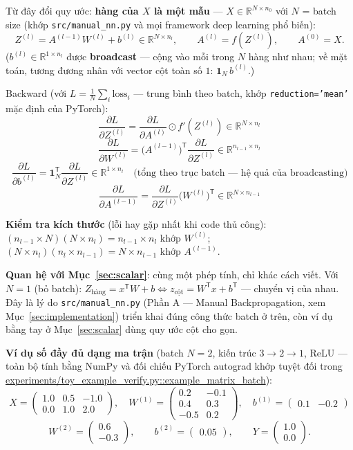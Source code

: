 \documentclass[12pt,a4paper]{article}
\newcommand{\T}{^{\mathsf{T}}}
\begin{document}
Từ đây đổi quy ước: \textbf{hàng của $X$ là một mẫu} ---
$X\in\mathbb R^{N\times n_0}$ với $N$ = batch size (khớp
\texttt{src/manual\_nn.py} và mọi framework deep learning phổ biến):
$$Z^{(l)} = A^{(l-1)}W^{(l)} + b^{(l)} \in \mathbb R^{N\times n_l},\qquad
A^{(l)} = f(Z^{(l)}),\qquad A^{(0)}=X.$$
($b^{(l)}\in\mathbb R^{1\times n_l}$ được \textbf{broadcast} --- cộng vào
mỗi trong $N$ hàng như nhau; về mặt toán, tương đương nhân với vector cột
toàn số $1$: $\mathbf 1_N\, b^{(l)}$.)

Backward (với $L=\tfrac1N\sum_i \mathrm{loss}_i$ --- trung bình theo batch,
khớp \texttt{reduction='mean'} mặc định của PyTorch):
$$\frac{\partial L}{\partial Z^{(l)}} = \frac{\partial L}{\partial A^{(l)}}\odot f'(Z^{(l)}) \in \mathbb R^{N\times n_l}$$
$$\frac{\partial L}{\partial W^{(l)}} = \big(A^{(l-1)}\big)\T\frac{\partial L}{\partial Z^{(l)}} \in \mathbb R^{n_{l-1}\times n_l}$$
$$\frac{\partial L}{\partial b^{(l)}} = \mathbf 1_N\T\frac{\partial L}{\partial Z^{(l)}} \in \mathbb R^{1\times n_l}\quad\text{(tổng theo trục batch --- hệ quả của broadcasting)}$$
$$\frac{\partial L}{\partial A^{(l-1)}} = \frac{\partial L}{\partial Z^{(l)}}\big(W^{(l)}\big)\T \in \mathbb R^{N\times n_{l-1}}$$

\textbf{Kiểm tra kích thước} (lỗi hay gặp nhất khi code thủ công):
$(n_{l-1}\times N)(N\times n_l)=n_{l-1}\times n_l$ khớp $W^{(l)}$;
$(N\times n_l)(n_l\times n_{l-1})=N\times n_{l-1}$ khớp $A^{(l-1)}$.

\textbf{Quan hệ với Mục~\ref{sec:scalar}}: cùng một phép tính, chỉ khác
cách viết. Với $N=1$ (bỏ batch): $Z_{\text{hàng}} = x\T W+b
\Leftrightarrow z_{\text{cột}} = W\T x+b\T$ --- chuyển vị của nhau. Đây là
lý do \texttt{src/manual\_nn.py} (Phần A --- Manual Backpropagation, xem
Mục~\ref{sec:implementation}) triển khai đúng công thức batch ở trên, còn
ví dụ bằng tay ở Mục~\ref{sec:scalar} dùng quy ước cột cho gọn.

\textbf{Ví dụ số đầy đủ dạng ma trận} (batch $N=2$, kiến trúc
$3\to2\to1$, ReLU --- toàn bộ tính bằng NumPy và đối chiếu PyTorch
autograd khớp tuyệt đối trong
\url{experiments/toy_example_verify.py::example_matrix_batch}):
$$X=\begin{pmatrix}1.0 & 0.5 & -1.0\\ 0.0 & 1.0 & 2.0\end{pmatrix},\quad
W^{(1)}=\begin{pmatrix}0.2 & -0.1\\ 0.4 & 0.3\\ -0.5 & 0.2\end{pmatrix},\quad
b^{(1)}=\begin{pmatrix}0.1 & -0.2\end{pmatrix}$$
$$W^{(2)}=\begin{pmatrix}0.6\\ -0.3\end{pmatrix},\qquad
b^{(2)}=\begin{pmatrix}0.05\end{pmatrix},\qquad
Y=\begin{pmatrix}1.0\\ 0.0\end{pmatrix}.$$
\end{document}
